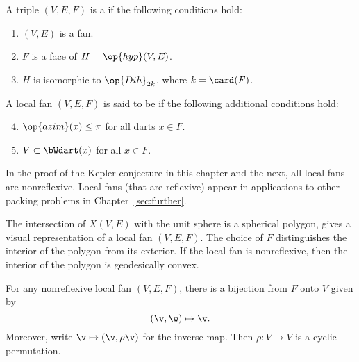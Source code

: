 \begin{definition} \label{def:convex-local}
A triple $(V,E,F)$ is a  if the following conditions hold:
\begin{enumerate} 
\item {} $(V,E)$ is a fan.
\item {} $F$ is a face of $H = \op{hyp}(V,E)$.
\item {} $H$ is isomorphic to $\op{Dih}_{2k}$, where $k =
\card(F)$.
\end{enumerate}
A local fan $(V,E,F)$ is said to be  if the following
additional conditions hold:
\begin{enumerate}
\setcounter{enumi}{3}
\item %
 $\op{azim}(x)\le \pi$ for all darts $x\in F$.
\item {} $V\subset \bWdart(x)$ for all $x\in F$.
\end{enumerate}
\end{definition}
%

In the proof of the Kepler conjecture in this chapter and the next,
all local fans are nonreflexive.  Local fans (that are reflexive) appear in
applications to other packing problems in Chapter~\ref{sec:further}.

\begin{remark}[visualization]
  The intersection of $X(V,E)$ with the unit sphere is a spherical
  polygon, gives a visual representation of a local fan $(V,E,F)$.
  The choice of $F$ distinguishes the interior of the polygon from its
  exterior.  If the local fan is nonreflexive, then the interior of the
  polygon is geodesically convex.
\end{remark}


\begin{lemma}[]%
For any nonreflexive local fan $(V,E,F)$, there is a bijection from $F$ onto $V$
given by
\[ 
(\v,\w) \mapsto \v.
\] 
Moreover, write $\v\mapsto(\v,\rho\v)$ for the inverse map. 
Then $\rho:V\to V$ is a cyclic permutation.
\end{lemma}
%

